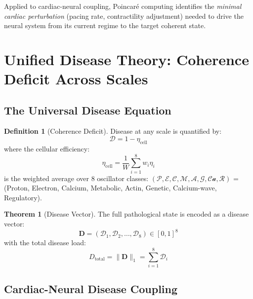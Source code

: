 \documentclass[12pt,a4paper]{article}
\theoremstyle{definition}
\newtheorem{theorem}{Theorem}
\newtheorem{definition}{Definition}
\begin{document}
Applied to cardiac-neural coupling, Poincaré computing identifies the
\emph{minimal cardiac perturbation} (pacing rate, contractility adjustment)
needed to drive the neural system from its current regime to the target
coherent state.

\section{Unified Disease Theory: Coherence Deficit Across Scales}
\label{sec:disease}

\subsection{The Universal Disease Equation}

\begin{definition}[Coherence Deficit]
\label{def:coherence_deficit}
Disease at any scale is quantified by:
\begin{equation}
\boxed{\mathcal{D} = 1 - \eta_{\text{cell}}}
\end{equation}
where the cellular efficiency:
\begin{equation}
\eta_{\text{cell}} = \frac{1}{W}\sum_{i=1}^8 w_i \eta_i
\end{equation}
is the weighted average over 8 oscillator classes:
$(\mathcal{P}, \mathcal{E}, \mathcal{C}, \mathcal{M}, \mathcal{A}, \mathcal{G}, \mathcal{Ca}, \mathcal{R})$
= (Proton, Electron, Calcium, Metabolic, Actin, Genetic, Calcium-wave, Regulatory).
\end{definition}

\begin{theorem}[Disease Vector]
The full pathological state is encoded as a disease vector:
\begin{equation}
\mathbf{D} = (\mathcal{D}_1, \mathcal{D}_2, \ldots, \mathcal{D}_8) \in [0,1]^8
\end{equation}
with the total disease load:
\begin{equation}
D_{\text{total}} = \|\mathbf{D}\|_1 = \sum_{i=1}^8 \mathcal{D}_i
\end{equation}
\end{theorem}

\subsection{Cardiac-Neural Disease Coupling}
\end{document}
